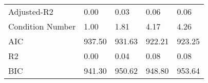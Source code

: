 \begin{table}
\begin{center}
\begin{tabular}{lllll}
Adjusted-R2                           & 0.00   & 0.03     & 0.06     & 0.06      \\
Condition Number                      & 1.00   & 1.81     & 4.17     & 4.26      \\
AIC                                   & 937.50 & 931.63   & 922.21   & 923.25    \\
R2                                    & 0.00   & 0.04     & 0.08     & 0.08      \\
BIC                                   & 941.30 & 950.62   & 948.80   & 953.64    \\
\hline
\end{tabular}
\end{center}
\end{table}